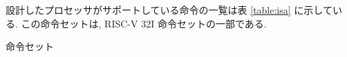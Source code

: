 \documentclass[../specifications.tex]{subfiles}
\begin{document}
  設計したプロセッサがサポートしている命令の一覧は表 \ref{table:isa} に示している.
  この命令セットは, RISC-V 32I 命令セットの一部である.

  \begin{table}
    \centering
    \caption{命令セット}
    \label{table:isa}
  \end{table}
  
\end{document}

